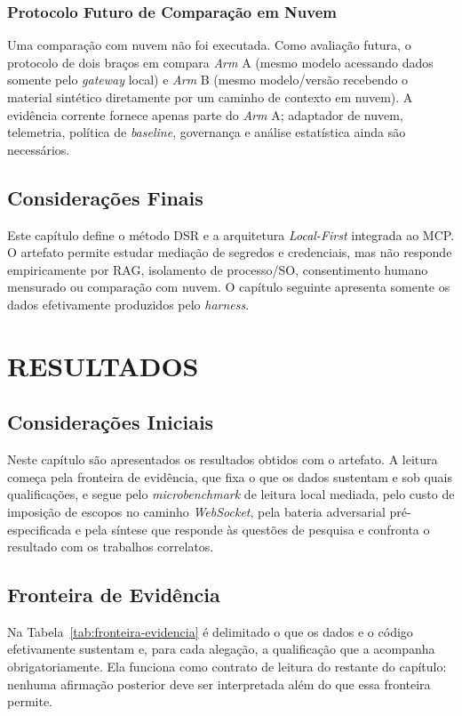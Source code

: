 \subsection{Protocolo Futuro de Comparação em Nuvem}
Uma comparação com nuvem não foi executada. Como avaliação futura, o protocolo de dois braços em  compara \textit{Arm} A (mesmo modelo acessando dados somente pelo \textit{gateway} local) e \textit{Arm} B (mesmo modelo/versão recebendo o material sintético diretamente por um caminho de contexto em nuvem). A evidência corrente fornece apenas parte do \textit{Arm} A; adaptador de nuvem, telemetria, política de \textit{baseline}, governança e análise estatística ainda são necessários.

\section{Considerações Finais}
Este capítulo define o método DSR e a arquitetura \textit{Local-First} integrada ao MCP. O artefato permite estudar mediação de segredos e credenciais, mas não responde empiricamente por RAG, isolamento de processo/SO, consentimento humano mensurado ou comparação com nuvem. O capítulo seguinte apresenta somente os dados efetivamente produzidos pelo \textit{harness}.

\chapter{RESULTADOS}
\section{Considerações Iniciais}
Neste capítulo são apresentados os resultados obtidos com o artefato. A leitura começa pela fronteira de evidência, que fixa o que os dados sustentam e sob quais qualificações, e segue pelo \textit{microbenchmark} de leitura local mediada, pelo custo de imposição de escopos no caminho \textit{WebSocket}, pela bateria adversarial pré-especificada e pela síntese que responde às questões de pesquisa e confronta o resultado com os trabalhos correlatos.

\section{Fronteira de Evidência}
\label{sec:fronteira-evidencia}
Na Tabela~\ref{tab:fronteira-evidencia} é delimitado o que os dados e o código efetivamente sustentam e, para cada alegação, a qualificação que a acompanha obrigatoriamente. Ela funciona como contrato de leitura do restante do capítulo: nenhuma afirmação posterior deve ser interpretada além do que essa fronteira permite.


